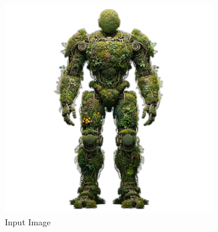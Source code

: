 \begin{figure}[ht]
\begin{subfigure}[b]{0.38\textwidth}
        \includegraphics[width=\textwidth]{etc/a robot made out of plants/magic123/robot made out of plants_noBG_resized.png}
        \caption{Input Image}
    \end{subfigure}
    \begin{subfigure}[b]{0.21\textwidth}
        \centering

\end{subfigure}
\end{figure}
